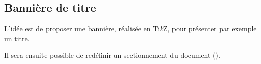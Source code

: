 \documentclass[french,11pt,a4paper]{article}
\providecommand\tikzlogo{Ti\textit{k}Z}
\let\TikZ\tikzlogo
\begin{document}
%
%
%
%
%
%
%
%
%
%
%
%
%
%
%
%

\subsection{Bannière de titre}

L'idée est de proposer une bannière, réalisée en \TikZ, pour présenter par exemple un titre.

Il sera ensuite possible de redéfinir un sectionnement du document ().
\end{document}
